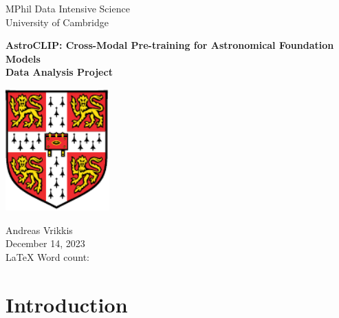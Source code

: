 \documentclass[a4paper,12pt]{article}
\begin{document}
    
    \vspace*{3cm}
    
    \begin{center}
     {\Large MPhil Data Intensive Science}  \\ [3pt]
     {\Large University of Cambridge}  \\ [3pt]
     
     \vspace*{1cm}
     \hrulefill
     \vspace*{0.75cm}
     
     {\LARGE \textbf{AstroCLIP: Cross-Modal Pre-training for Astronomical Foundation Models}} \\ [6pt]
     \large \textbf{Data Analysis Project} \\ [6pt]
     \vspace*{0.05cm}
     \hrulefill
     \vspace*{1.5cm}

    \includegraphics[width=0.3\textwidth]{../figures/University_Crest.pdf} 

    \vspace*{1.5cm}
     
     {\Large  Andreas Vrikkis} \\ [6pt]
     {\large  December 14, 2023} \\ [3pt]
     {\large  \LaTeX \hspace{0.03cm} Word count:  } \\ [3pt]
     
     \end{center}   
    
    
    \newpage
    
    \restoregeometry
    
    \newpage
    
    \tableofcontents
    
    \newpage
\section{Introduction}
\end{document}

